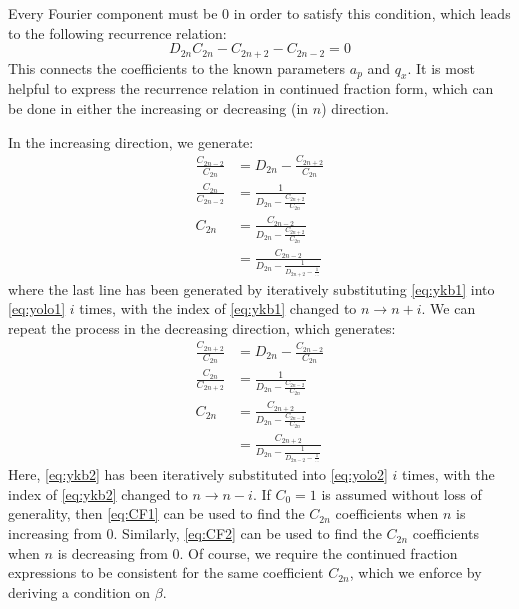 \documentclass{article}
\begin{document}
Every Fourier component must be 0 in order to satisfy this condition, which leads to the following recurrence relation:
\begin{equation}
	D_{2n} C_{2n} - C_{2n + 2} - C_{2n - 2} = 0
\label{eq:phoebe}
\end{equation}
This connects the coefficients to the known parameters $a_p$ and $q_x$. It is most helpful to express the recurrence relation in continued fraction form, which can be done in either the increasing or decreasing (in $n$) direction.\par
\medskip
\noindent In the increasing direction, we generate:
\begin{align}
	\frac{C_{2n-2}}{C_{2n}} & = D_{2n} - \frac{C_{2n + 2}}{C_{2n}} \nonumber \\
	\frac{C_{2n}}{C_{2n - 2}} & = \frac{1}{D_{2n} - \frac{C_{2n + 2}}{C_{2n}}} \label{eq:ykb1} \\
	C_{2n} & = \frac{C_{2n - 2}}{D_{2n} - \frac{C_{2n + 2}}{C_{2n}}} \label{eq:yolo1} \\
	& = \frac{C_{2n - 2}}{D_{2n} - \frac{1}{D_{2n+2} - \frac{1}{\dots}}} \label{eq:CF1}
\end{align}
where the last line has been generated by iteratively substituting \eqref{eq:ykb1} into \eqref{eq:yolo1} $i$ times, with the index of \eqref{eq:ykb1} changed to $n \rightarrow n + i$. We can repeat the process in the decreasing direction, which generates:
\begin{align}
\frac{C_{2n + 2}}{C_{2n}} & = D_{2n} - \frac{C_{2n - 2}}{C_{2n}}	 \nonumber \\
\frac{C_{2n}}{C_{2n + 2}} & = \frac{1}{D_{2n} - \frac{C_{2n - 2}}{C_{2n}}} \label{eq:ykb2} \\
C_{2n} & = \frac{C_{2n + 2}}{D_{2n} - \frac{C_{2n - 2}}{C_{2n}}} \label{eq:yolo2} \\
& = \frac{C_{2n + 2}}{D_{2n} - \frac{1}{D_{2n-2} - \frac{1}{\dots}}} \label{eq:CF2}
\end{align}
Here, \eqref{eq:ykb2} has been iteratively substituted into \eqref{eq:yolo2} $i$ times, with the index of \eqref{eq:ykb2} changed to $n \rightarrow n - i$. If $C_{0} = 1$ is assumed without loss of generality, then \eqref{eq:CF1} can be used to find the $C_{2n}$ coefficients when $n$ is increasing from 0. Similarly, \eqref{eq:CF2} can be used to find the $C_{2n}$ coefficients when $n$ is decreasing from 0. Of course, we require the continued fraction expressions to be consistent for the same coefficient $C_{2n}$, which we enforce by deriving a condition on $\beta$. \par
\end{document}
